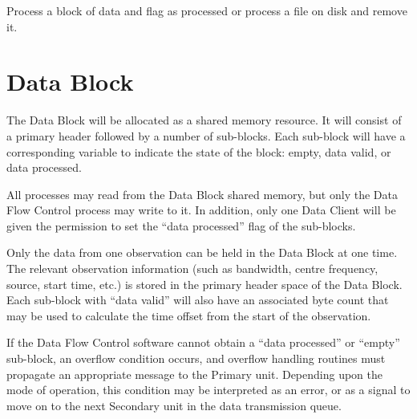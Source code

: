 Process a block of data and flag as processed or process a file on
disk and remove it.

\section{Data Block}
\label{sec:data_block}

The Data Block will be allocated as a shared memory resource.  It will
consist of a primary header followed by a number of sub-blocks.  Each
sub-block will have a corresponding variable to indicate the state of
the block: empty, data valid, or data processed.

All processes may read from the Data Block shared memory, but only the
Data Flow Control process may write to it.  In addition, only one Data
Client will be given the permission to set the ``data processed'' flag
of the sub-blocks.

Only the data from one observation can be held in the Data Block at
one time.  The relevant observation information (such as bandwidth,
centre frequency, source, start time, etc.) is stored in the primary
header space of the Data Block.  Each sub-block with ``data valid''
will also have an associated byte count that may be used to calculate
the time offset from the start of the observation.

If the Data Flow Control software cannot obtain a ``data processed''
or ``empty'' sub-block, an overflow condition occurs, and overflow
handling routines must propagate an appropriate message to the Primary
unit.  Depending upon the mode of operation, this condition may be
interpreted as an error, or as a signal to move on to the next
Secondary unit in the data transmission queue.
